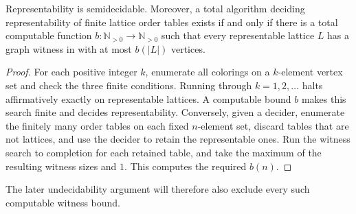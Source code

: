 \begin{corollary}\label{f:cor-witness-bound}
Representability is semidecidable. Moreover, a total algorithm deciding
representability of finite lattice order tables exists if and only if there
is a total computable function $b:\mathbb N_{>0}\to\mathbb N_{>0}$ such that
every representable lattice $L$ has a graph witness in  with
at most $b(|L|)$ vertices.
\end{corollary}
\begin{proof}
For each positive integer $k$, enumerate all colorings on a $k$-element vertex
set and check the three finite conditions. Running through $k=1,2,\ldots$
halts affirmatively exactly on representable lattices. A computable bound
$b$ makes this search finite and decides representability. Conversely, given
a decider, enumerate the finitely many order tables on each fixed
$n$-element set, discard tables that are not lattices, and use the decider to
retain the representable ones. Run the witness search to completion for each
retained table, and take the maximum of the resulting witness sizes and $1$.
This computes the required $b(n)$.
\end{proof}

The later undecidability argument will therefore also exclude every such
computable witness bound.
